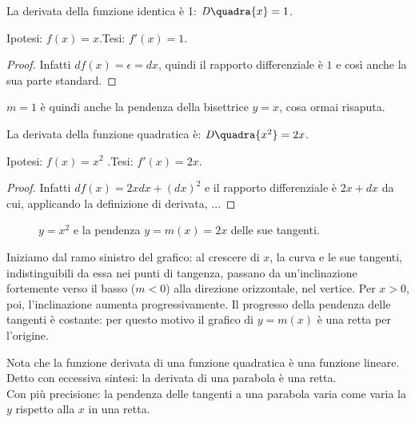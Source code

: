 \begin{teorema}
  La derivata della funzione identica è 1: $\mathit{D}\quadra{x}=1$.
\end{teorema}
\noindent Ipotesi: $f(x)=x$.\tab Tesi: $f'(x)=1$.
\begin{proof}
 Infatti $df(x)=\epsilon=dx$, quindi il rapporto differenziale è $1$ e così
 anche la sua parte standard.
\end{proof}
\begin{osservazione}
 $m=1$ è quindi anche la pendenza della bisettrice $y=x$, cosa ormai risaputa.
\end{osservazione}

\begin{teorema}
  La derivata della funzione quadratica è: $\mathit{D}\quadra{x^2}=2x$.
\end{teorema}
\noindent Ipotesi: $f(x)=x^2$ .\tab Tesi: $f'(x)=2x$.
\begin{proof}
  Infatti $df(x)=2xdx+(dx)^2$ e il rapporto differenziale è $2x+dx$ da cui,
  applicando la definizione di derivata, ...
\end{proof}

\begin{figure}[h!]
\begin{inaccessibleblock}
 \begin{center}
 \begin{minipage}[]{.48\textwidth}
 \parabola
 \end{minipage} 
 \hfill
 \begin{minipage}[]{.48\textwidth}
  \tangentiparabola
 \end{minipage}
 \end{center}
\end{inaccessibleblock}
\caption{$y=x^2$ e la pendenza $y=m(x)=2x$ delle sue tangenti.} 
\label{}
\end{figure}

Iniziamo dal ramo sinistro del grafico: al crescere di $x$, la curva e le sue 
tangenti, indistinguibili da essa nei punti di tangenza, passano
da un'inclinazione fortemente verso il basso ($m<0$) alla direzione orizzontale,
nel vertice. Per $x>0$, poi, l'inclinazione aumenta progressivamente. Il 
progresso della pendenza delle tangenti è costante: per questo motivo il 
grafico di $y=m(x)$ è una retta per l'origine.

\begin{osservazione}
Nota che la funzione derivata di una funzione quadratica è una funzione 
lineare. Detto con eccessiva sintesi: la derivata di una parabola è una retta.\\
Con più precisione: la pendenza delle tangenti a una parabola
varia come varia la $y$ rispetto alla $x$ in una retta.
\end{osservazione}

